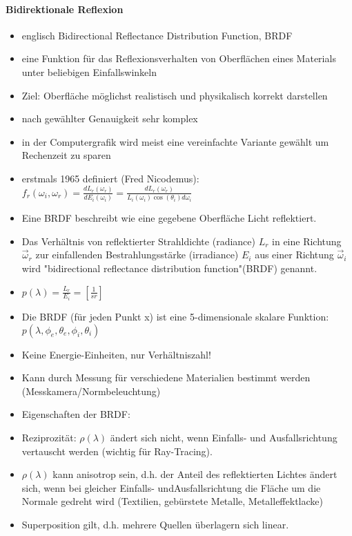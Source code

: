 \documentclass[10pt,landscape]{article}
\begin{document}
\begin{multicols}{3}
\paragraph{Bidirektionale Reflexion}
\begin{itemize}
  \item englisch Bidirectional Reflectance Distribution Function, BRDF
  \item eine Funktion für das Reflexionsverhalten von Oberflächen eines Materials unter beliebigen Einfallswinkeln
  \item Ziel: Oberfläche möglichst realistisch und physikalisch korrekt darstellen
  \item nach gewählter Genauigkeit sehr komplex
  \item in der Computergrafik wird meist eine vereinfachte Variante gewählt um Rechenzeit zu sparen
  \item erstmals 1965 definiert (Fred Nicodemus): $f_r(\omega_i, \omega_r)=\frac{dL_r(\omega_r)}{dE_i(\omega_i)}=\frac{dL_r(\omega_r)}{L_i(\omega_i)\cos(\theta_i)d\omega_i}$
  \item Eine BRDF beschreibt wie eine gegebene Oberfläche Licht reflektiert.
  \item Das Verhältnis von reflektierter Strahldichte (radiance) $L_r$ in eine Richtung $\vec{\omega}_r$ zur einfallenden Bestrahlungsstärke (irradiance) $E_i$ aus einer Richtung $\vec{\omega}_i$ wird "bidirectional reflectance distribution function"(BRDF) genannt.
  \item $p(\lambda)=\frac{L_r}{E_i}=[\frac{1}{sr}]$
  \item Die BRDF (für jeden Punkt x) ist eine 5-dimensionale skalare Funktion: $p(\lambda, \phi_e, \theta_e, \phi_i, \theta_i)$
  \item Keine Energie-Einheiten, nur Verhältniszahl!
  \item Kann durch Messung für verschiedene Materialien bestimmt werden (Messkamera/Normbeleuchtung)
  \item Eigenschaften der BRDF:
  \item Reziprozität: $\rho(\lambda)$ ändert sich nicht, wenn Einfalls- und Ausfallsrichtung vertauscht werden (wichtig für Ray-Tracing).
  \item $\rho(\lambda)$ kann anisotrop sein, d.h. der Anteil des reflektierten Lichtes ändert sich, wenn bei gleicher Einfalls- undAusfallsrichtung die Fläche um die Normale gedreht wird (Textilien, gebürstete Metalle, Metalleffektlacke)
  \item Superposition gilt, d.h. mehrere Quellen überlagern sich linear.
\end{itemize}


\end{multicols}
\end{document}
